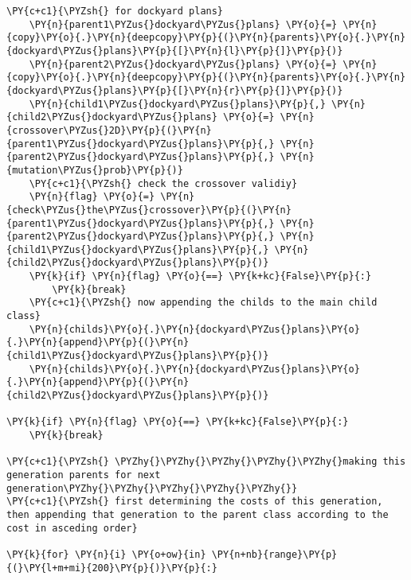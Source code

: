 \begin{tcolorbox}[breakable, size=fbox, boxrule=1pt, pad at break*=1mm,colback=cellbackground, colframe=cellborder]
\begin{Verbatim}[commandchars=\\\{\}]
    \PY{c+c1}{\PYZsh{} for dockyard plans}
    \PY{n}{parent1\PYZus{}dockyard\PYZus{}plans} \PY{o}{=} \PY{n}{copy}\PY{o}{.}\PY{n}{deepcopy}\PY{p}{(}\PY{n}{parents}\PY{o}{.}\PY{n}{dockyard\PYZus{}plans}\PY{p}{[}\PY{n}{l}\PY{p}{]}\PY{p}{)}
    \PY{n}{parent2\PYZus{}dockyard\PYZus{}plans} \PY{o}{=} \PY{n}{copy}\PY{o}{.}\PY{n}{deepcopy}\PY{p}{(}\PY{n}{parents}\PY{o}{.}\PY{n}{dockyard\PYZus{}plans}\PY{p}{[}\PY{n}{r}\PY{p}{]}\PY{p}{)}
    \PY{n}{child1\PYZus{}dockyard\PYZus{}plans}\PY{p}{,} \PY{n}{child2\PYZus{}dockyard\PYZus{}plans} \PY{o}{=} \PY{n}{crossover\PYZus{}2D}\PY{p}{(}\PY{n}{parent1\PYZus{}dockyard\PYZus{}plans}\PY{p}{,} \PY{n}{parent2\PYZus{}dockyard\PYZus{}plans}\PY{p}{,} \PY{n}{mutation\PYZus{}prob}\PY{p}{)}
    \PY{c+c1}{\PYZsh{} check the crossover validiy}
    \PY{n}{flag} \PY{o}{=} \PY{n}{check\PYZus{}the\PYZus{}crossover}\PY{p}{(}\PY{n}{parent1\PYZus{}dockyard\PYZus{}plans}\PY{p}{,} \PY{n}{parent2\PYZus{}dockyard\PYZus{}plans}\PY{p}{,} \PY{n}{child1\PYZus{}dockyard\PYZus{}plans}\PY{p}{,} \PY{n}{child2\PYZus{}dockyard\PYZus{}plans}\PY{p}{)}
    \PY{k}{if} \PY{n}{flag} \PY{o}{==} \PY{k+kc}{False}\PY{p}{:}
        \PY{k}{break}
    \PY{c+c1}{\PYZsh{} now appending the childs to the main child class}
    \PY{n}{childs}\PY{o}{.}\PY{n}{dockyard\PYZus{}plans}\PY{o}{.}\PY{n}{append}\PY{p}{(}\PY{n}{child1\PYZus{}dockyard\PYZus{}plans}\PY{p}{)}
    \PY{n}{childs}\PY{o}{.}\PY{n}{dockyard\PYZus{}plans}\PY{o}{.}\PY{n}{append}\PY{p}{(}\PY{n}{child2\PYZus{}dockyard\PYZus{}plans}\PY{p}{)}

\PY{k}{if} \PY{n}{flag} \PY{o}{==} \PY{k+kc}{False}\PY{p}{:}
    \PY{k}{break}

\PY{c+c1}{\PYZsh{} \PYZhy{}\PYZhy{}\PYZhy{}\PYZhy{}\PYZhy{}making this generation parents for next generation\PYZhy{}\PYZhy{}\PYZhy{}\PYZhy{}\PYZhy{}}
\PY{c+c1}{\PYZsh{} first determining the costs of this generation, then appending that generation to the parent class according to the cost in asceding order}

\PY{k}{for} \PY{n}{i} \PY{o+ow}{in} \PY{n+nb}{range}\PY{p}{(}\PY{l+m+mi}{200}\PY{p}{)}\PY{p}{:}
    

\end{Verbatim}
\end{tcolorbox}
